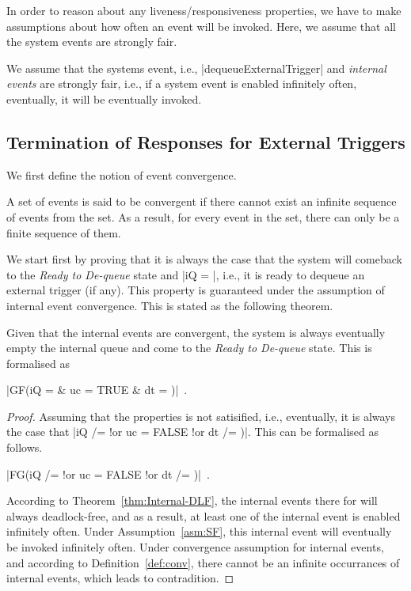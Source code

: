 In order to reason about any liveness/responsiveness properties, we
have to make assumptions about how often an event will be invoked.
Here, we assume that all the system events are strongly fair.
\begin{assumption}
  \label{asm:SF}
  We assume that the systems event, i.e., |dequeueExternalTrigger|
  and \emph{internal events} are strongly fair, i.e., if a system
  event is enabled infinitely often, eventually, it will be eventually
  invoked.
\end{assumption}


\subsection{Termination of Responses for External Triggers}
\label{sec:contr-rema-resp}

We first define the notion of event convergence.
\begin{definition}
  \label{def:conv}
  A set of events is said to be convergent if there cannot exist an
  infinite sequence of events from the set.  As a result, for every
  event in the set, there can only be a finite sequence of them.
\end{definition}

We start first by proving that it is always the case that the system
will comeback to the \emph{Ready to De-queue} state and |iQ = {}|,
i.e., it is ready to dequeue an external trigger (if any).  This
property is guaranteed under the assumption of internal event
convergence.  This is stated as the following theorem.
\begin{theorem}
  \label{thm:finite-internal-events}
  Given that the internal events are convergent, the system
  is always eventually empty the internal queue and come to the
  \emph{Ready to De-queue} state.  This is formalised as
  \begin{center}
    |GF(iQ = {} & uc = TRUE & dt = {})|~.
  \end{center}
\end{theorem}
\begin{proof}
  Assuming that the properties is not satisified, i.e., eventually,
  it is always the case that %
  |iQ /= {} !or  uc = FALSE !or dt /=  {})|.  %
  This can be formalised as follows.
  \begin{center}
    |FG(iQ /= {} !or uc = FALSE !or dt /= {})|~.    
  \end{center}
  According to Theorem~\ref{thm:Internal-DLF}, the internal events
  there for will always deadlock-free, and as a result, at least one
  of the internal event is enabled infinitely often. Under
  Assumption~\ref{asm:SF}, this internal event will eventually be
  invoked infinitely often.  Under convergence assumption for internal
  events, and according to Definition~\ref{def:conv}, there cannot be
  an infinite occurrances of internal events, which leads to
  contradition.
\end{proof}


